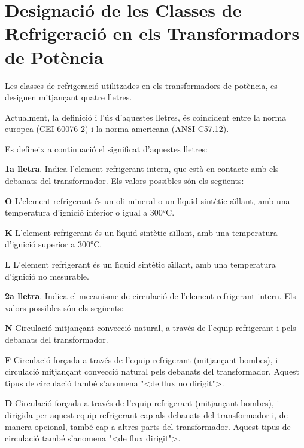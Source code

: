 \chapter{Designaci\'{o} de les Classes de Refrigeraci\'{o} en els Transformadors de Pot\`{e}ncia}
   

Les classes de refrigeraci\'{o} utilitzades en els transformadors de
pot\`{e}ncia, es designen mitjan\c{c}ant quatre lletres.

Actualment, la definici\'{o} i l'\'{u}s d'aquestes lletres, \'{e}s coincident
entre la norma europea (\textsf{CEI 60076-2}) i la norma americana
(\textsf{ANSI C57.12}).

Es defineix a continuaci\'{o} el significat d'aquestes lletres:

\textbf{1a lletra}. Indica l'element refrigerant intern, que est\`{a} en
contacte amb els debanats del transformador. Els valors possibles
s\'{o}n els seg\"{u}ents:
\begin{list}{}
   {\setlength{\labelwidth}{4.5mm} \setlength{\leftmargin}{4.5mm} \setlength{\labelsep}{2mm}}
   \item[\textbf{O}] L'element refrigerant \'{e}s un oli mineral o un l\'{\i}quid sint\`{e}tic a\"{\i}llant, amb una temperatura d'ignici\'{o}
   inferior o igual a 300\unit{\celsius}.
   \item[\textbf{K}] L'element refrigerant \'{e}s un l\'{\i}quid sint\`{e}tic a\"{\i}llant, amb una temperatura d'ignici\'{o}
   superior a 300\unit{\celsius}.
   \item[\textbf{L}] L'element refrigerant \'{e}s un l\'{\i}quid sint\`{e}tic a\"{\i}llant, amb una temperatura d'ignici\'{o}
   no mesurable.
\end{list}
  

\textbf{2a lletra}. Indica el mecanisme de circulaci\'{o} de l'element
refrigerant intern. Els valors possibles s\'{o}n els seg\"{u}ents:
\begin{list}{}
   {\setlength{\labelwidth}{4.5mm} \setlength{\leftmargin}{4.5mm} \setlength{\labelsep}{2mm}}
   \item[\textbf{N}] Circulaci\'{o} mitjan\c{c}ant convecci\'{o} natural,
    a trav\'{e}s de l'equip refrigerant i pels debanats del transformador.
   \item[\textbf{F}] Circulaci\'{o} for\c{c}ada a trav\'{e}s de l'equip refrigerant (mitjan\c{c}ant bombes),
    i circulaci\'{o} mitjan\c{c}ant convecci\'{o} natural pels debanats del
    transformador. Aquest tipus de circulaci\'{o} tamb\'{e} s'anomena {"<}de flux no
    dirigit{">}.
   \item[\textbf{D}] Circulaci\'{o} for\c{c}ada a trav\'{e}s de l'equip refrigerant (mitjan\c{c}ant bombes),
    i dirigida per aquest equip refrigerant cap als debanats del
    transformador i, de manera opcional, tamb\'{e} cap a altres parts del transformador. Aquest
    tipus de circulaci\'{o} tamb\'{e} s'anomena {"<}de flux dirigit{">}.
\end{list}
  

